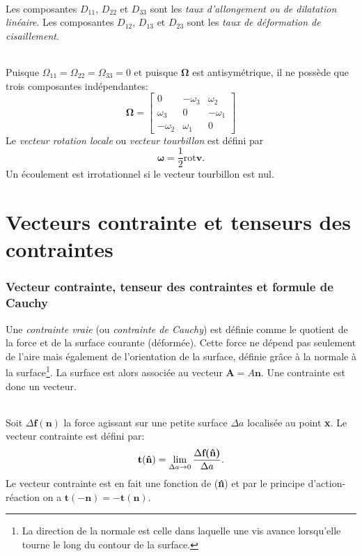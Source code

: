 \paragraph{}
Les composantes $D_{11}$, $D_{22}$ et $D_{33}$ sont les \emph{taux d'allongement ou de dilatation linéaire}. Les composantes $D_{12}$, $D_{13}$ et $D_{23}$ sont les \emph{taux de déformation de cisaillement}.
\paragraph{}
Puisque $\Omega_{11}=\Omega_{22}=\Omega_{33}=0$ et puisque $\mathbf{\Omega}$ est antisymétrique, il ne possède que trois composantes indépendantes:
$$\mathbf{\Omega}=\left[
\begin{array}{ccc}
0&-\omega_3&\omega_2\\
\omega_3&0&-\omega_1\\
-\omega_2&\omega_1&0
\end{array}\right]$$
Le \emph{vecteur rotation locale} ou \emph{vecteur tourbillon} est défini par
$$\mathbf{\omega}=\frac{1}{2}\text{rot}\textbf{v}.$$
Un écoulement est irrotationnel si le vecteur tourbillon est nul.

\part{Vecteurs contrainte et tenseurs des contraintes}
\section{Vecteur contrainte, tenseur des contraintes et formule de Cauchy}

Une \emph{contrainte vraie} (ou \emph{contrainte de Cauchy}) est définie comme le quotient de la force et de la surface courante (déformée). Cette force ne dépend pas seulement de l'aire mais également de l'orientation de la surface, définie grâce à la normale à la surface\footnote{La direction de la normale est celle dans laquelle une vis avance lorsqu'elle tourne le long du contour de la surface.}. La surface est alors associée au vecteur $\textbf{A}=A\textbf{\^n}$. Une contrainte est donc un vecteur.
\paragraph{}
Soit $\Delta\textbf{f}(\textbf{\^n})$ la force agissant sur une petite surface $\Delta a$ localisée au point \textbf{x}. Le vecteur contrainte est défini par: $$\textbf{t}(\textbf{\^n})=\lim_{\Delta a\rightarrow 0}\frac{\Delta\textbf{f(\textbf{\^n})}}{\Delta a}.$$ Le vecteur contrainte est en fait une fonction de (\textbf{\^n}) et par le principe d'action-réaction on a $\textbf{t}(-\textbf{\^n})=-\textbf{t}(\textbf{\^n})$.
